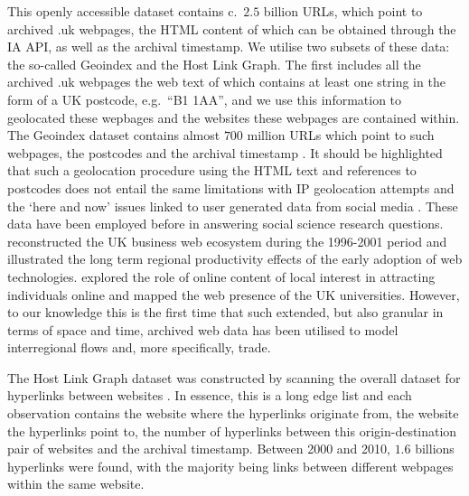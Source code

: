 \documentclass[]{interact}
\theoremstyle{plain}%
\theoremstyle{definition}
\theoremstyle{remark}
\begin{document}
This openly accessible dataset contains c.~\(2.5\) billion URLs, which
point to archived .uk webpages, the HTML content of which can be
obtained through the IA API, as well as the archival timestamp. We
utilise two subsets of these data: the so-called Geoindex and the Host
Link Graph. The first includes all the archived .uk webpages the web
text of which contains at least one string in the form of a UK postcode,
e.g.~``B1 1AA'', and we use this information to geolocated these
wepbages and the websites these webpages are contained within. The
Geoindex dataset contains almost \(700\) million URLs which point to
such webpages, the postcodes and the archival timestamp
\citep{BL2013geo}. It should be highlighted that such a geolocation
procedure using the HTML text and references to postcodes does not
entail the same limitations with IP geolocation attempts
\citep{zook2000web} and the `here and now' issues linked to user
generated data from social media \citep{geotag}. These data have been
employed before in answering social science research questions.
\citet{Musso2016} reconstructed the UK business web ecosystem during the
1996-2001 period and \citet{tranos2020digital} illustrated the long term
regional productivity effects of the early adoption of web technologies.
\citet{tranos2020individual} explored the role of online content of
local interest in attracting individuals online and \citet{Hale2014}
mapped the web presence of the UK universities. However, to our
knowledge this is the first time that such extended, but also granular
in terms of space and time, archived web data has been utilised to model
interregional flows and, more specifically, trade.

The Host Link Graph dataset was constructed by scanning the overall
dataset for hyperlinks between websites \citep{BL2013links}. In essence,
this is a long edge list and each observation contains the website where
the hyperlinks originate from, the website the hyperlinks point to, the
number of hyperlinks between this origin-destination pair of websites
and the archival timestamp. Between 2000 and 2010, \(1.6\) billions
hyperlinks were found, with the majority being links between different
webpages within the same website.
\end{document}
